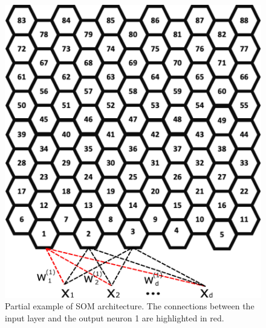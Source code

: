 \begin{figure}[h!]
\centering
\includegraphics[scale=0.35]{figs/arquitetura.eps}
\caption{Partial example of SOM architecture. The connections between the input layer and the output neuron 1 are highlighted in red.}
\label{fig:architecuture}
\end{figure}



